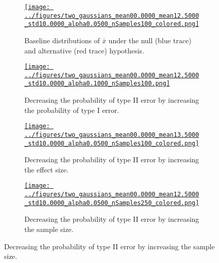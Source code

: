 \documentclass[12pt]{article}
\begin{document}
\begin{enumerate}[(a)]
        \begin{figure}[H]
            \begin{center}
                \begin{subfigure}{0.4\textwidth}
                    \centering
                    \href{https://www.gatsby.ucl.ac.uk/~rapela/neuroinformatics/2023/ws1/figures/two_gaussians_mean00.0000_mean12.5000_std10.0000_alpha0.0500_nSamples100.html}{\texttt{[image: ../figures/two\_gaussians\_mean00.0000\_mean12.5000\_std10.0000\_alpha0.0500\_nSamples100\_colored.png]}}
                    \caption{Baseline distributions of $\bar{x}$ under the null
                    (blue trace) and alternative (red trace) hypothesis.}
                    \label{fig:ex1b_intro_a}
                \end{subfigure}
                \hfill
                \begin{subfigure}{0.4\textwidth}
                    \centering
                    \href{https://www.gatsby.ucl.ac.uk/~rapela/neuroinformatics/2023/ws1/figures/two_gaussians_mean00.0000_mean12.5000_std10.0000_alpha0.1000_nSamples100.html}{\texttt{[image: ../figures/two\_gaussians\_mean00.0000\_mean12.5000\_std10.0000\_alpha0.1000\_nSamples100.png]}}
                    \caption{Decreasing the probability of type II error by
                    increasing the probability of type I error.}
                    \label{fig:ex1b_intro_b}
                \end{subfigure}
                \hfill
                \begin{subfigure}{0.4\textwidth}
                    \centering
                    \href{https://www.gatsby.ucl.ac.uk/~rapela/neuroinformatics/2023/ws1/figures/two_gaussians_mean00.0000_mean13.5000_std10.0000_alpha0.0500_nSamples100.html}{\texttt{[image: ../figures/two\_gaussians\_mean00.0000\_mean13.5000\_std10.0000\_alpha0.0500\_nSamples100\_colored.png]}}
                    \caption{Decreasing the probability of type II error by
                    increasing the effect size.}
                    \label{fig:ex1b_intro_c}
                \end{subfigure}
                \hfill
                \begin{subfigure}{0.4\textwidth}
                    \centering
                    \href{https://www.gatsby.ucl.ac.uk/~rapela/neuroinformatics/2023/ws1/figures/two_gaussians_mean00.0000_mean12.5000_std10.0000_alpha0.0500_nSamples250.html}{\texttt{[image: ../figures/two\_gaussians\_mean00.0000\_mean12.5000\_std10.0000\_alpha0.0500\_nSamples250\_colored.png]}}
                    \caption{Decreasing the probability of type II error by
                    increasing the sample size.}
                    \label{fig:ex1b_intro_d}
                \end{subfigure}


\end{center}
\end{figure}
\end{enumerate}
\end{document}
